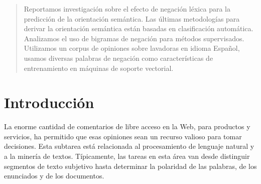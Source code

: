 \documentclass[a0,portrait]{a0poster}
\begin{document}
\vspace{1cm} %


\begin{multicols}{2} %


\color{Navy} %

\begin{abstract}
Reportamos investigación sobre el efecto de negación léxica para la predicción de la orientación semántica. Las últimas metodologías para derivar la orientación semántica están basadas en clasificación automática. Analizamos el uso de bigramas de negación para métodos supervisados. Utilizamos un corpus de opiniones sobre lavadoras en idioma Español, usamos diversas palabras de negación como características de entrenamiento en máquinas de soporte vectorial.
\end{abstract}


\color{SaddleBrown} %

\section*{Introducción}
La enorme cantidad de comentarios de libre acceso en la Web, para productos y servicios, ha permitido que esas opiniones sean un recurso valioso para tomar decisiones. Esta subtarea está relacionada al procesamiento de lenguaje natural y a la minería de textos. Típicamente, las tareas en esta área van desde distinguir segmentos de texto subjetivo hasta determinar la polaridad de las palabras, de los enunciados y de los documentos.



\end{multicols}
\end{document}
